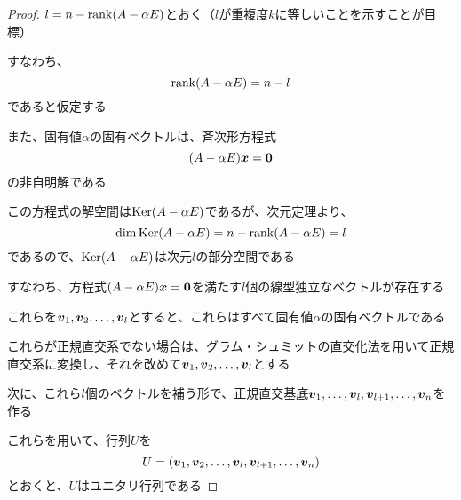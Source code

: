 \documentclass[../../../topic_linear-algebra]{subfiles}
\begin{document}
\begin{proof}
  $l = n- \rank(A - \alpha E)$とおく（$l$が重複度$k$に等しいことを示すことが目標）

  すなわち、
  \begin{equation*}
    \rank(A - \alpha E) = n - l
  \end{equation*}
  であると仮定する

  \br

  また、固有値$\alpha$の固有ベクトルは、斉次形方程式
  \begin{equation*}
    (A - \alpha E)\vb*{x} = \vb*{0}
  \end{equation*}
  の非自明解である

  この方程式の解空間は$\operatorname{Ker}(A - \alpha E)$であるが、次元定理より、
  \begin{equation*}
    \dim \operatorname{Ker}(A - \alpha E) = n - \rank(A - \alpha E) = l
  \end{equation*}
  であるので、$\operatorname{Ker}(A - \alpha E)$は次元$l$の部分空間である

  \br

  すなわち、方程式$(A - \alpha E)\vb*{x} = \vb*{0}$を満たす$l$個の線型独立なベクトルが存在する

  \br

  これらを$\vb*{v}_1, \vb*{v}_2, \dots, \vb*{v}_l$とすると、これらはすべて固有値$\alpha$の固有ベクトルである

  これらが正規直交系でない場合は、グラム・シュミットの直交化法を用いて正規直交系に変換し、それを改めて$\vb*{v}_1, \vb*{v}_2, \dots, \vb*{v}_l$とする

  \br

  次に、これら$l$個のベクトルを補う形で、正規直交基底$\vb*{v}_1, \ldots, \vb*{v}_l, \vb*{v}_{l+1}, \ldots, \vb*{v}_n$を作る

  これらを用いて、行列$U$を
  \begin{equation*}
    U = (\vb*{v}_1, \vb*{v}_2, \ldots, \vb*{v}_l, \vb*{v}_{l+1}, \ldots, \vb*{v}_n)
  \end{equation*}
  とおくと、$U$はユニタリ行列である

  \br


\end{proof}
\end{document}
